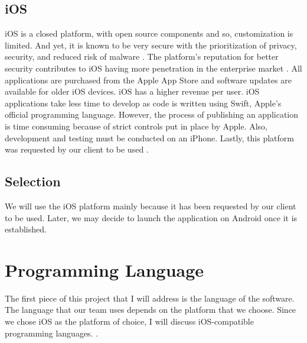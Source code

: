 \documentclass[onecolumn, draftclsnofoot,10pt, journal, letterpaper]{IEEEtran}
\begin{document}
    \subsection{iOS}
        iOS is a closed platform, with open source components and so, customization is limited. And yet, it is known to be very secure with the prioritization of privacy, security, and reduced risk of malware \cite{techahead}. The platform's reputation for better security contributes to iOS having more penetration in the enterprise market \cite{medium}. All applications are purchased from the Apple App Store and software updates are available for older iOS devices. iOS has a higher revenue per user. iOS applications take less time to develop as code is written using Swift, Apple's official programming language. However, the process of publishing an application is time consuming because of strict controls put in place by Apple. Also, development and testing must be conducted on an iPhone. Lastly, this platform was requested by our client to be used \cite{techahead}.

    \subsection{Selection}
        We will use the iOS platform mainly because it has been requested by our client to be used. Later, we may decide to launch the application on Android once it is established.

\section{Programming Language}
    The first piece of this project that I will address is the language of the software. The language that our team uses depends on the platform that we choose. Since we chose iOS as the platform of choice, I will discuss iOS-compatible programming languages. . 
    
\end{document}
